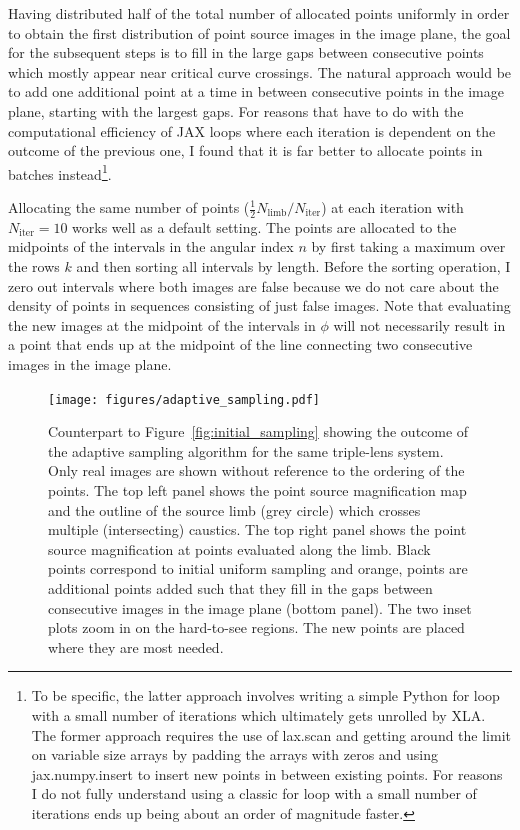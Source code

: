 \documentclass[12pt,dvipsnames]{report}
\newcommand{\ssf}[1]{\textsf{#1}}
\begin{document}
Having distributed half of the total number of allocated points uniformly in order to obtain the first 
distribution of point source images in the image plane, the goal for the subsequent steps is 
to fill in the large gaps between consecutive points which mostly appear near critical 
curve crossings. The natural approach would be to add one additional point at a time in 
between consecutive points in the image plane, starting with the largest gaps.
For reasons that have to do with the computational efficiency of \ssf{JAX} loops where each
iteration is dependent on the outcome of the previous one, I found that it is far 
better to allocate points in batches instead\footnote{To be specific, the latter approach 
involves writing a simple \ssf{Python} \ssf{for} loop with a small number of iterations which 
ultimately gets unrolled by \ssf{XLA}. The former approach requires the use of \ssf{lax.scan}
and getting around the limit on variable size arrays by padding the arrays with zeros and using
\ssf{jax.numpy.insert} to insert new points in between existing points. For reasons I do not
fully understand using a classic \ssf{for} loop with a small number of iterations ends up being 
about an order of magnitude faster.}. 

Allocating the same number of points 
($\frac{1}{2}N_\mathrm{limb}/N_\mathrm{iter}$) at each iteration  with $N_\mathrm{iter}=10$ 
works well as a default setting. The points are allocated to the midpoints of the intervals 
in the angular index $n$ by first taking a maximum over the rows $k$ and then sorting all 
intervals by length. Before the sorting operation, I zero out intervals where both images 
are false because we do not care about the density of points in sequences consisting of just
false images. Note that evaluating the new images at the midpoint of the intervals in 
$\phi$ will not necessarily result in a point that ends up at the midpoint of the line 
connecting two consecutive images in the image plane.

\begin{figure}[!t]
    \begin{centering}
        \texttt{[image: figures/adaptive\_sampling.pdf]}
        \caption{
            Counterpart to Figure~\ref{fig:initial_sampling} showing the outcome of the
            adaptive sampling algorithm for the same triple-lens system. 
            Only real images are shown without reference to the ordering of the points.
            The top left panel  shows the point source magnification map and the outline of 
            the source limb (grey circle) which crosses multiple (intersecting) caustics. 
            The top right panel shows the 
            point source magnification at points evaluated along the limb. Black points correspond 
            to initial uniform sampling and orange, points are additional points added such that 
            they fill in the gaps between consecutive images in the image plane (bottom panel).
            The two inset plots zoom in on the hard-to-see regions. The new points are placed
            where they are most needed.}
        \label{fig:adaptive_sampling}
    \end{centering}
\end{figure}
\end{document}
